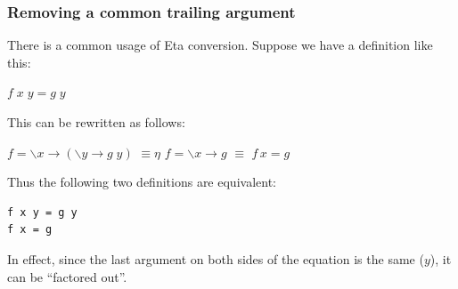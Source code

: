 \documentclass{beamer}
\newcommand{\etaconv}{\hbox{\quad$\equiv\eta$\quad}}
\begin{document}
\begin{frame}[fragile]
\frametitle{Removing a common trailing argument}

There is a common usage of Eta conversion.  Suppose we have a
definition like this:

$f \;x \;y = g\; y$

\vspace{1em}

This can be rewritten as follows:

\vspace{1em}

$f = \backslash x \rightarrow (\backslash y \rightarrow g \;y)$
\etaconv
$f = \backslash x \rightarrow g$
\quad $\equiv$ \quad
$f\, x = g$

Thus the following two definitions are equivalent:

\begin{verbatim}
f x y = g y
f x = g
\end{verbatim}

In effect, since the last argument on both sides of the equation is
the same ($y$), it can be ``factored out''.

\end{frame}
%
%
%
%
%
%
\end{document}
